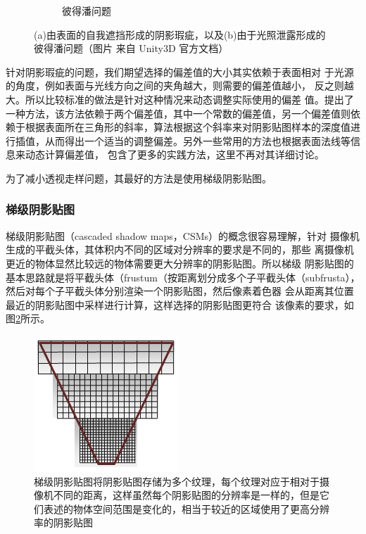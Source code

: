 \begin{figure}
\begin{subfigure}[b]{0.5\textwidth}
		\caption{彼得潘问题}
	\end{subfigure}
	\caption{(a)由表面的自我遮挡形成的阴影瑕疵，以及(b)由于光照泄露形成的彼得潘问题（图片 来自 Unity3D 官方文档）}
	\label{f:df-depth-bias}
\end{figure}

针对阴影瑕疵的问题，我们期望选择的偏差值的大小其实依赖于表面相对 于光源的角度，例如表面与光线方向之间的夹角越大，则需要的偏差值越小， 反之则越大。所以比较标准的做法是针对这种情况来动态调整实际使用的偏差 值。\cite{a:Eliminatesurfaceacnewithgradientshadowmapping}提出了一种方法，该方法依赖于两个偏差值，其中一个常数的偏差值，另一个偏差值则依赖于根据表面所在三角形的斜率，算法根据这个斜率来对阴影贴图样本的深度值进行插值，从而得出一个适当的调整偏差。另外一些常用的方法也根据表面法线等信息来动态计算偏差值\cite{a:Adaptivedepthbiasforshadowmaps}， \cite{b:rts}包含了更多的实践方法，这里不再对其详细讨论。

  为了减小透视走样问题，其最好的方法是使用梯级阴影贴图。




\subsubsection{梯级阴影贴图}
梯级阴影贴图（cascaded shadow maps，CSMs）的概念很容易理解，针对 摄像机生成的平截头体，其体积内不同的区域对分辨率的要求是不同的，那些 离摄像机更近的物体显然比较远的物体需要更大分辨率的阴影贴图。所以梯级 阴影贴图的基本思路就是将平截头体（frustum（按距离划分成多个子平截头体（subfrusta），然后对每个子平截头体分别渲染一个阴影贴图，然后像素着色器 会从距离其位置最近的阴影贴图中采样进行计算，这样选择的阴影贴图更符合 该像素的要求，如图\ref{f:df-cascaded-shadow-map}所示。

\begin{figure}
\sidecaption
	\includegraphics[width=.45\textwidth]{figures/shadows/cascaded-shadow-map}
	\caption{梯级阴影贴图将阴影贴图存储为多个纹理，每个纹理对应于相对于摄像机不同的距离，这样虽然每个阴影贴图的分辨率是一样的，但是它们表述的物体空间范围是变化的，相当于较近的区域使用了更高分辨率的阴影贴图}
	\label{f:df-cascaded-shadow-map}
\end{figure}

